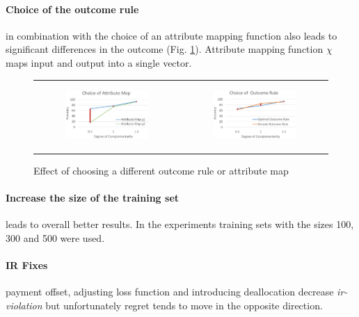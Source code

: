 \documentclass[]{article}
\begin{document}
\paragraph{Choice of the outcome rule} in combination with the choice of an attribute mapping function also leads to significant differences in the outcome (Fig. \ref{choiceOutAttr}). Attribute mapping function $\chi$ maps input and output into a single vector.
\begin{figure}[!ht]
	\begin{tabular}{c c}
		\begin{subfigure}{0.5\textwidth}
			\begin{center}
				\includegraphics[width=55mm]{res/choiceAttributeMap-cropped.pdf}
			\end{center}
		\end{subfigure} &
		\begin{subfigure}{0.5\textwidth}
			\includegraphics[width=55mm]{res/choiceOutcomeRule-cropped.pdf}
		\end{subfigure}
	\end{tabular}
	\caption{Effect of choosing a different outcome rule or attribute map}
	\label{choiceOutAttr}
\end{figure}

\paragraph{Increase the size of the training set}  leads to overall better results. In the experiments training sets with the sizes 100, 300 and 500 were used.

\paragraph{IR Fixes} payment offset, adjusting loss function and introducing deallocation decrease \emph{ir-violation} but unfortunately regret tends to move in the opposite direction.
\end{document}
